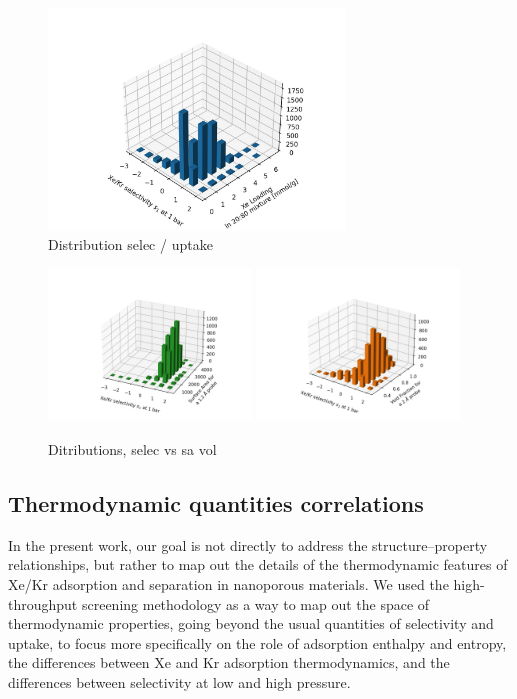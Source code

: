 \documentclass[main]{subfiles}
\begin{document}
\begin{figure}[ht]
  \centering
  \includegraphics[width=0.7\textwidth]{figures/2-thermo/3D_hist_selec_uptake.jpg}
  \caption{Distribution selec / uptake}
\end{figure}

\begin{figure}[ht]
  \centering
  \includegraphics[width=0.48\textwidth]{figures/2-thermo/3D_hist_selec_SA.jpg}
  \includegraphics[width=0.48\textwidth]{figures/2-thermo/3D_hist_selec_vol.jpg}
  \caption{Ditributions, selec vs sa vol}
\end{figure}

\subsection{Thermodynamic quantities correlations}

In the present work, our goal is not directly to address the structure--property relationships, but rather to map out the details of the thermodynamic features of Xe/Kr adsorption and separation in nanoporous materials. We used the high-throughput screening methodology as a way to map out the space of thermodynamic properties, going beyond the usual quantities of selectivity and uptake, to focus more specifically on the role of adsorption enthalpy and entropy, the differences between Xe and Kr adsorption thermodynamics, and the differences between selectivity at low and high pressure.
\end{document}
